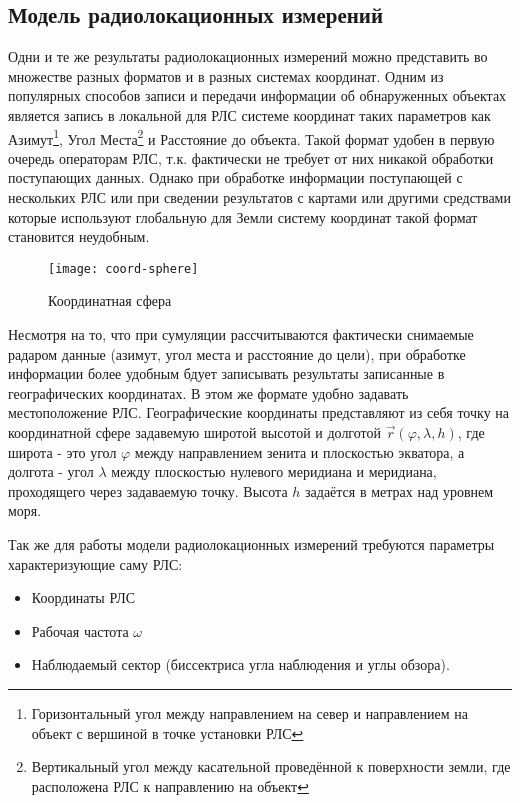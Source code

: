 \subsection{Модель радиолокационных измерений}

Одни и те же результаты радиолокационных измерений можно представить во множестве разных форматов и в разных 
системах координат. Одним из популярных способов записи и передачи информации об обнаруженных объектах является
запись в локальной для РЛС системе координат таких параметров как Азимут\footnote{Горизонтальный угол между
направлением на север и направлением на объект с вершиной в точке установки РЛС}, Угол Места\footnote{Вертикальный
угол между касательной проведённой к поверхности земли, где расположена РЛС к направлению на объект} и Расстояние до
объекта. Такой формат удобен в первую очередь операторам РЛС, т.к. фактически не требует от них никакой обработки
поступающих данных. Однако при обработке информации поступающей с нескольких РЛС или при сведении результатов с
картами или другими средствами которые используют глобальную для Земли систему координат такой формат становится
неудобным. 

\begin{wrapfigure}{r}{0.45\textwidth}
	\begin{center}
			\texttt{[image: coord-sphere]}
	\end{center}
	\caption{Координатная сфера}
\end{wrapfigure}
Несмотря на то, что при сумуляции рассчитываются фактически снимаемые радаром данные (азимут, угол места и расстояние до цели), при обработке информации более удобным бдует записывать результаты записанные в географических
координатах. В этом же формате удобно задавать местоположение РЛС. Географические координаты представляют из себя
точку на координатной сфере задавемую широтой высотой и долготой $\vec{r}(\varphi, \lambda, h)$, где широта - это
угол $\varphi$ между направлением зенита и плоскостью экватора, а долгота - угол $\lambda$ между плоскостью нулевого
меридиана и меридиана, проходящего через задаваемую точку. Высота $h$ задаётся в метрах над уровнем моря.

Так же для работы модели радиолокационных измерений требуются параметры характеризующие саму РЛС:
\begin{itemize}
	\item Координаты РЛС
	\item Рабочая частота $\omega$
	\item Наблюдаемый сектор (биссектриса угла наблюдения и углы обзора).
\end{itemize}

